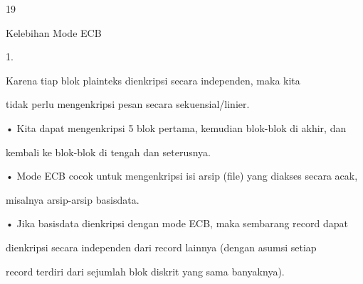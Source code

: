\documentclass{article}
\begin{document}

19

Kelebihan Mode ECB

1.

Karena tiap blok plainteks dienkripsi secara independen, maka kita 

tidak perlu mengenkripsi pesan secara sekuensial/linier. 

• Kita dapat mengenkripsi 5 blok pertama, kemudian blok-blok di akhir, dan  

kembali ke blok-blok di tengah dan seterusnya.

• Mode ECB cocok untuk mengenkripsi isi arsip (file) yang diakses secara acak, 

misalnya arsip-arsip basisdata. 

• Jika basisdata dienkripsi dengan mode ECB, maka sembarang record dapat 

dienkripsi secara independen dari record lainnya (dengan asumsi setiap 

record terdiri dari sejumlah blok diskrit yang sama banyaknya).
\end{document}
